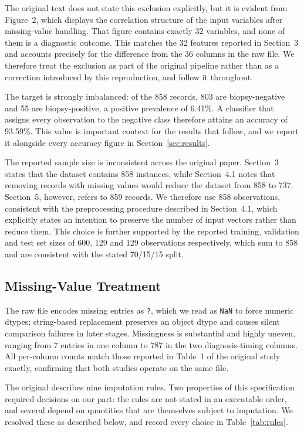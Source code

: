 The original text does not state this exclusion explicitly, but it is evident
from Figure~2, which displays the correlation structure of the input variables
after missing-value handling. That figure contains exactly 32 variables, and
none of them is a diagnostic outcome. This matches the 32 features reported in
Section~3 and accounts precisely for the difference from the 36 columns in the
raw file. We therefore treat the exclusion as part of the original pipeline
rather than as a correction introduced by this reproduction, and follow it
throughout.

The target is strongly imbalanced: of the 858 records, 803 are biopsy-negative
and 55 are biopsy-positive, a positive prevalence of 6.41\%. A classifier that
assigns every observation to the negative class therefore attains an accuracy
of 93.59\%. This value is important context for the results that follow, and we
report it alongside every accuracy figure in Section~\ref{sec:results}.

The reported sample size is inconsistent across the original paper. Section~3
states that the dataset contains 858 instances, while Section~4.1 notes that
removing records with missing values would reduce the dataset from 858 to 737.
Section~5, however, refers to 859 records. We therefore use 858 observations,
consistent with the preprocessing procedure described in Section~4.1, which
explicitly states an intention to preserve the number of input vectors rather
than reduce them. This choice is further supported by the reported training,
validation and test set sizes of 600, 129 and 129 observations respectively,
which sum to 858 and are consistent with the stated 70/15/15 split.

\subsection{Missing-Value Treatment}\label{sec:missing}

The raw file encodes missing entries as \texttt{?}, which we read as
\texttt{NaN} to force numeric dtypes; string-based replacement preserves an
object dtype and causes silent comparison failures in later stages. Missingness
is substantial and highly uneven, ranging from 7 entries in one column to 787
in the two diagnosis-timing columns. All per-column counts match those reported
in Table~1 of the original study exactly, confirming that both studies operate
on the same file.

The original describes nine imputation rules. Two properties of this
specification required decisions on our part: the rules are not stated in an
executable order, and several depend on quantities that are themselves subject
to imputation. We resolved these as described below, and record every choice in
Table~\ref{tab:rules}.

